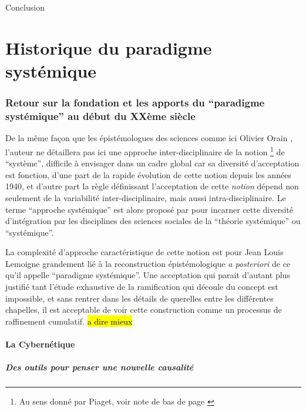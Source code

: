 Conclusion

\appendix

\chapter{Historique du paradigme systémique}

\subsection{Retour sur la fondation et les apports du \enquote{paradigme systémique} au début du XXème siècle}
\label{ssec:systemique}

De la même façon que les épistémologues des sciences comme ici Olivier Orain \autocite{Orain2001}, l'auteur ne détaillera pas ici une approche inter-disciplinaire de la notion \footnote{Au sens donné par Piaget, voir note de bas de page \autocite {Orain2001}} de \enquote{système}, difficile à envisager dans un cadre global car sa diversité d'acceptation est fonction, d'une part de la rapide évolution de cette notion depuis les années 1940, et d'autre part la règle définissant l'acceptation de cette \textit{notion} dépend non seulement de la variabilité inter-disciplinaire, mais aussi intra-disciplinaire. Le terme \enquote{approche systémique} est alors proposé par \autocite{Orain2001} pour incarner cette diversité d'intégration par les disciplines des sciences sociales de la \enquote{théorie systémique} ou \enquote{systémique}.

La complexité d'approche caractéristique de cette notion est pour Jean Louis Lemoigne grandement lié à la reconstruction épistémologique \textit{a posteriori} de ce qu'il appelle \enquote{paradigme systémique}. Une acceptation qui parait d'autant plus justifié tant l'étude exhaustive de la ramification qui découle du concept est impossible, et sans rentrer dans les détails de querelles entre les différentes chapelles, il est acceptable de voir cette construction comme un processus de raffinement cumulatif. \hl{a dire mieux}

\subsubsection{La Cybernétique}
\label{ssubsec:cybernetic}

\paragraph{Des outils pour penser une nouvelle causalité}

